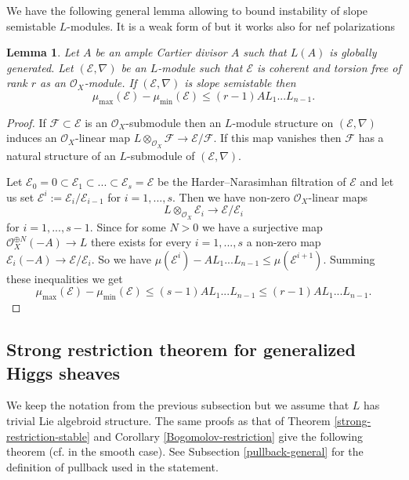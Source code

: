 \documentclass[12pt]{article}
\theoremstyle{plain}
\newtheorem{Lemma}[Thm]{\sc Lemma}
\theoremstyle{definition}
\theoremstyle{remark}
\newcommand{\cE}{{\mathcal E}}
\newcommand{\cF}{{\mathcal F}}
\newcommand{\cO}{{\mathcal O}}
\begin{document}
We have the following general lemma allowing to bound instability of slope semistable $L$-modules. It is a weak form of \cite[Lemma 5]{La3} but it works also for nef polarizations

\begin{Lemma}\label{L-module-ss-bound}
	Let $A$ be  an ample Cartier divisor $A$ such that $L(A)$ is globally generated.
Let $(\cE, \nabla)$ be an $L$-module such that $\cE$ is coherent and torsion free of rank $r$ as an $\cO_X$-module. If $(\cE, \nabla)$ is slope semistable then
$$\mu _{\max} (\cE)-\mu _{\min} (\cE) \le (r-1) AL_1...L_{n-1} .$$
\end{Lemma}

\begin{proof}
	If $\cF \subset \cE$ is an $\cO_X$-submodule then an $L$-module structure on  $(\cE, \nabla)$
	induces an $\cO_X$-linear map $L\otimes _{\cO_X}\cF\to \cE/\cF$. If this map vanishes then 
	$\cF$ has a natural structure of an $L$-submodule of  $(\cE, \nabla)$.
	
	Let $\cE_0=0\subset \cE_1\subset ...\subset \cE_s=\cE$ be the  Harder--Narasimhan filtration of $\cE$ and let us set $\cE ^{i}:=\cE_i/\cE_{i-1}$ for $i=1,...,s$. Then we have non-zero $\cO_X$-linear maps
	$$L\otimes _{\cO_X}\cE_i\to \cE /\cE_i$$
for $i=1,...,s-1$.  Since for some $N>0$ we have a surjective map $\cO _X ^{\oplus N}(-A)\to L$
 there exists  for every $i=1,...,s$ a non-zero map $\cE_i(-A)\to \cE /\cE_i.$
	So we have $\mu (\cE ^{i})- AL_1...L_{n-1}\le \mu (\cE ^{i+1})$.
	Summing these inequalities we get
	$$\mu _{\max} (\cE)-\mu _{\min} (\cE) \le (s-1) AL_1...L_{n-1}\le (r-1) AL_1...L_{n-1}. $$
\end{proof}


\subsection{Strong restriction theorem  for generalized Higgs sheaves}

We keep the notation from the previous subsection but we assume that $L$ has trivial Lie algebroid structure.  The same proofs as that of Theorem \ref{strong-restriction-stable} and Corollary \ref{Bogomolov-restriction} give the following theorem
(cf. \cite[Theorem 9]{La3} in the smooth case). See Subsection \ref{pullback-general} for the definition of pullback used in the statement. 
 
\end{document}
